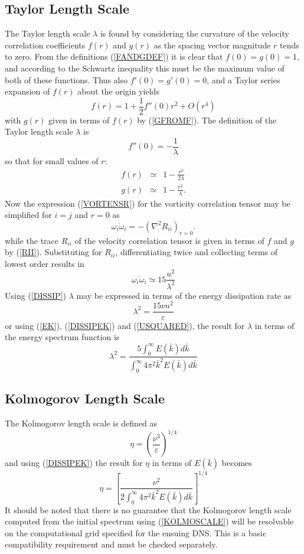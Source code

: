 \documentclass[dvips]{article}
\begin{document}
\subsection{Taylor Length Scale}
The Taylor length scale $\lambda$ is found by considering the curvature
of the velocity correlation coefficients $f(r)$ and $g(r)$ as the spacing
vector magnitude $r$ tends to zero.  From the definitions
(\ref{FANDGDEF}) it is clear that $f(0) = g(0) = 1$, and according to
the Schwartz inequality \cite{batchelor53} this must be the maximum value of
both of these functions.  Thus also $f'(0) = g'(0) = 0$, and a Taylor
series expansion of $f(r)$ about the origin yields
\[
f(r) = 1 + \frac{1}{2}f''(0)r^{2} + O(r^{4})
\]
with $g(r)$ given in terms of $f(r)$ by (\ref{GFROMF}).
The definition of the Taylor length scale $\lambda$ is
\[
f''(0) = -\frac{1}{\lambda}
\]
so that for small values of $r$:
\begin{eqnarray}
f(r) & \simeq & 1 - \frac{r^{2}}{2\lambda} \nonumber \\
g(r) & \simeq & 1 - \frac{r^{2}}{\lambda}.
\end{eqnarray}
Now the expression (\ref{VORTENSR}) for the vorticity correlation tensor
may be simplified for $i=j$ and $r=0$ as
\[
\overline{\omega_{i}\omega_{i}} = -\left(\nabla^{2}R_{ii}\right)_{r=0}.
\]
while the trace $R_{ii}$ of the velocity correlation tensor is given in
terms of $f$ and $g$ by (\ref{RII}).  Substituting for $R_{ii}$,
differentiating twice and collecting terms of lowest order results in
\[
\overline{\omega_{i}\omega_{i}} \simeq 15\frac{u^{2}}{\lambda^{2}}
\]
Using (\ref{DISSIP}) $\lambda$ may be expressed in terms
of the energy dissipation rate as
\[
\lambda^{2} = \frac{15\nu u^{2}}{\varepsilon}
\]
or using (\ref{EK}), (\ref{DISSIPEK}) and (\ref{USQUARED}), the result
for $\lambda$ in terms of the energy spectrum function is
\begin{equation}
\lambda^{2} = \frac
{5 \int_{0}^{\infty}E(\bar{k})d\bar{k}}
{\int_{0}^{\infty} 4\pi^{2}\bar{k}^{2}E(\bar{k})d\bar{k}}
\label{LAMBDAEK}
\end{equation}

\subsection{Kolmogorov Length Scale}
The Kolmogorov length scale is defined as
\[
\eta = \left(\frac{\nu^{3}}{\varepsilon}\right)^{1/4}
\]
and using (\ref{DISSIPEK}) the result for $\eta$ in terms of $E(\bar{k})$
becomes
\begin{equation}
\eta = \left[\frac{\nu^{2}}{2\int_{0}^{\infty}4\pi^{2}\bar{k}^{2}E(\bar{k})d\bar{k}}\right]^{1/4}
\label{KOLMOSCALE}
\end{equation}
It should be noted that there is no guarantee that the 
Kolmogorov length scale computed from the initial spectrum using
(\ref{KOLMOSCALE}) will be resolvable on the computational grid
specified for the ensuing DNS.  This is a basic compatibility
requirement and must be checked separately.
\end{document}
